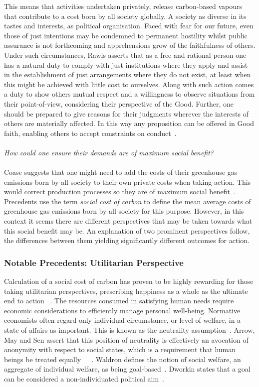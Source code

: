 \documentclass[11pt, oneside]{book}   	%
\begin{document}
This means that activities undertaken privately, release carbon-based vapours that contribute to a cost born by all society globally.
A society as diverse in its tastes and interests, as political organisation.
Faced with fear for our future, even those of just intentions may be condemned to permanent hostility whilst public assurance is not forthcoming and apprehensions grow of the faithfulness of others.
Under such circumstances, Rawls asserts that as a free and rational person one has a natural duty to comply with just institutions where they apply and assist in the establishment of just arrangements where they do not exist, at least when this might be achieved with little cost to ourselves.
Along with such action comes a duty to show others mutual respect and a willingness to observe situations from their point-of-view, considering their perspective of the Good.
Further, one should be prepared to give reasons for their judgments wherever the interests of others are materially affected. In this way any proposition can be offered in Good faith, enabling others to accept constraints on conduct~\cite{jr1}.\\
\\
 \emph{How could one ensure their demands are of maximum social benefit?}\\
 \\
Coase suggests that one might need to add the costs of their greenhouse gas emissions born by all society to their own private costs when taking action.
This would correct production processes so they are of maximum social benefit~\cite{rc1}.
Precedents use the term \emph{social cost of carbon} to define the mean average costs of greenhouse gas emissions born by all society for this purpose.
However, in this context it seems there are different perspectives that may be taken towards what this social benefit may be.
An explanation of two prominent perspectives follow, the differences between them yielding significantly different outcomes for action.

\subsubsection{Notable Precedents: Utilitarian Perspective}

Calculation of a social cost of carbon has proven to be highly rewarding for those taking utilitarian perspectives, prescribing happiness as a whole as the ultimate end to action ~\cite{hs1}. The resources consumed in satisfying human needs require economic considerations to efficiently manage personal well-being. Normative economists often regard only individual circumstance, or level of  welfare, in a state of affairs as important. This is known as the neutrality assumption~\cite{pd2}. Arrow, May and Sen assert that this position of neutrality is effectively an avocation of anonymity with respect to social states, which is a requirement that human beings be treated equally~\cite{ka1}~\cite{km1}~\cite{as2}. Waldron defines the notion of social welfare, an aggregate of individual welfare, as being goal-based~\cite{jw2}. Dworkin states that a goal can be considered a non-individuated political aim~\cite{rd1}.
\end{document}
